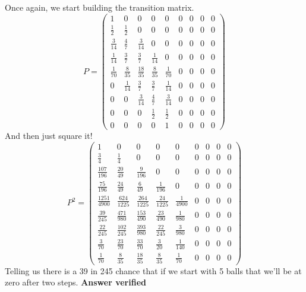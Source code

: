\subsection{}
Once again, we start building the transition matrix.
\begin{equation}
	P = \left(
\begin{array}{ccccccccc}
 1 & 0 & 0 & 0 & 0 & 0 & 0 & 0 & 0 \\
 \frac{1}{2} & \frac{1}{2} & 0 & 0 & 0 & 0 & 0 & 0 & 0 \\
 \frac{3}{14} & \frac{4}{7} & \frac{3}{14} & 0 & 0 & 0 & 0 & 0 & 0 \\
 \frac{1}{14} & \frac{3}{7} & \frac{3}{7} & \frac{1}{14} & 0 & 0 & 0 & 0 & 0 \\
 \frac{1}{70} & \frac{8}{35} & \frac{18}{35} & \frac{8}{35} & \frac{1}{70} & 0 & 0 & 0 & 0 \\
 0 & \frac{1}{14} & \frac{3}{7} & \frac{3}{7} & \frac{1}{14} & 0 & 0 & 0 & 0 \\
 0 & 0 & \frac{3}{14} & \frac{4}{7} & \frac{3}{14} & 0 & 0 & 0 & 0 \\
 0 & 0 & 0 & \frac{1}{2} & \frac{1}{2} & 0 & 0 & 0 & 0 \\
 0 & 0 & 0 & 0 & 1 & 0 & 0 & 0 & 0
\end{array}
\right)

\end{equation}
And then just square it!
\begin{equation}
	P^2 = \left(
\begin{array}{ccccccccc}
 1 & 0 & 0 & 0 & 0 & 0 & 0 & 0 & 0 \\
 \frac{3}{4} & \frac{1}{4} & 0 & 0 & 0 & 0 & 0 & 0 & 0 \\
 \frac{107}{196} & \frac{20}{49} & \frac{9}{196} & 0 & 0 & 0 & 0 & 0 & 0 \\
 \frac{75}{196} & \frac{24}{49} & \frac{6}{49} & \frac{1}{196} & 0 & 0 & 0 & 0 & 0 \\
 \frac{1251}{4900} & \frac{624}{1225} & \frac{264}{1225} & \frac{24}{1225} & \frac{1}{4900} & 0 & 0 & 0 & 0 \\
 \frac{39}{245} & \frac{471}{980} & \frac{153}{490} & \frac{23}{490} & \frac{1}{980} & 0 & 0 & 0 & 0 \\
 \frac{22}{245} & \frac{102}{245} & \frac{393}{980} & \frac{22}{245} & \frac{3}{980} & 0 & 0 & 0 & 0 \\
 \frac{3}{70} & \frac{23}{70} & \frac{33}{70} & \frac{3}{20} & \frac{1}{140} & 0 & 0 & 0 & 0 \\
 \frac{1}{70} & \frac{8}{35} & \frac{18}{35} & \frac{8}{35} & \frac{1}{70} & 0 & 0 & 0 & 0
\end{array}
\right)
\end{equation}
Telling us there is a 39 in 245 chance that if we start with 5 balls that we'll be at zero after two steps.
\textbf{Answer verified}

